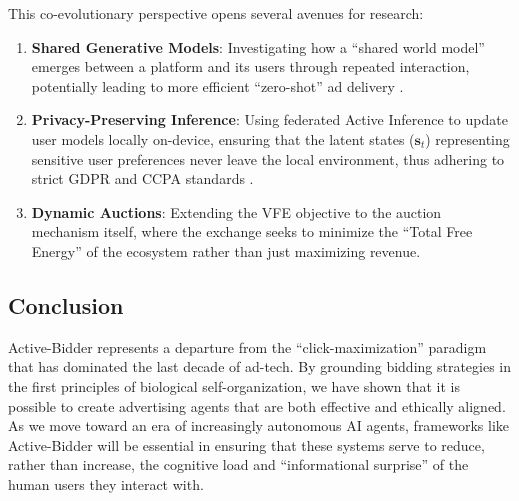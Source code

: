 This co-evolutionary perspective opens several avenues for research:
\begin{enumerate}
    \item \textbf{Shared Generative Models}: Investigating how a ``shared world model'' emerges between a platform and its users through repeated interaction, potentially leading to more efficient ``zero-shot'' ad delivery \cite{friston2024morphogenesis}.
    \item \textbf{Privacy-Preserving Inference}: Using federated Active Inference to update user models locally on-device, ensuring that the latent states ($\mathbf{s}_t$) representing sensitive user preferences never leave the local environment, thus adhering to strict GDPR and CCPA standards \cite{tan2022federated, li2025privacy}.
    \item \textbf{Dynamic Auctions}: Extending the VFE objective to the auction mechanism itself, where the exchange seeks to minimize the ``Total Free Energy'' of the ecosystem rather than just maximizing revenue.
\end{enumerate}

\subsection{Conclusion}
Active-Bidder represents a departure from the ``click-maximization'' paradigm that has dominated the last decade of ad-tech. By grounding bidding strategies in the first principles of biological self-organization, we have shown that it is possible to create advertising agents that are both effective and ethically aligned. As we move toward an era of increasingly autonomous AI agents, frameworks like Active-Bidder will be essential in ensuring that these systems serve to reduce, rather than increase, the cognitive load and ``informational surprise'' of the human users they interact with.